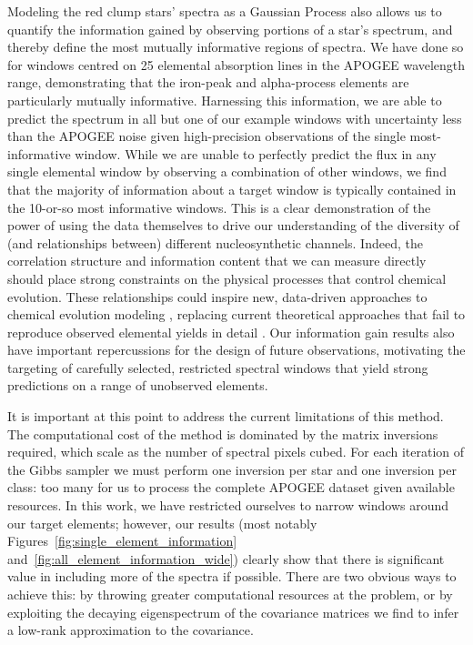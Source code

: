 \documentclass[a4paper,fleqn,usenatbib]{mnras}
\begin{document}
Modeling the red clump stars' spectra as a Gaussian Process also allows us to quantify the information gained by observing portions of a star's spectrum, and thereby define the most mutually informative regions of spectra. We have done so for windows centred on 25 elemental absorption lines in the APOGEE wavelength range, demonstrating that the iron-peak and alpha-process elements are particularly mutually informative. Harnessing this information, we are able to predict the spectrum in all but one of our example windows with uncertainty less than the APOGEE noise given high-precision observations of the single most-informative window. While we are unable to perfectly predict the flux in any single elemental window by observing a combination of other windows, we find that the majority of information about a target window is typically contained in the 10-or-so most informative windows. This is a clear demonstration of the power of using the data themselves to drive our understanding of the diversity of (and relationships between) different nucleosynthetic channels. Indeed, the correlation structure and information content that we can measure directly should place strong constraints on the physical processes that control chemical evolution. These relationships could inspire new, data-driven approaches to chemical evolution modeling \citep[also see][]{Casey2019}, replacing current theoretical approaches that fail to reproduce observed elemental yields in detail \citep[e.g.][]{Jan2017, Blancato2019}. Our information gain results also have important repercussions for the design of future observations, motivating the targeting of carefully selected, restricted spectral windows that yield strong predictions on a range of unobserved elements.

It is important at this point to address the current limitations of this method. The computational cost of the method is dominated by the matrix inversions required, which scale as the number of spectral pixels cubed. For each iteration of the Gibbs sampler we must perform one inversion per star and one inversion per class: too many for us to process the complete APOGEE dataset given available resources. In this work, we have restricted ourselves to narrow windows around our target elements; however, our results (most notably Figures~\ref{fig:single_element_information} and~\ref{fig:all_element_information_wide}) clearly show that there is significant value in including more of the spectra if possible. There are two obvious ways to achieve this: by throwing greater computational resources at the problem, or by exploiting the decaying eigenspectrum of the covariance matrices we find to infer a low-rank approximation to the covariance.
\end{document}
